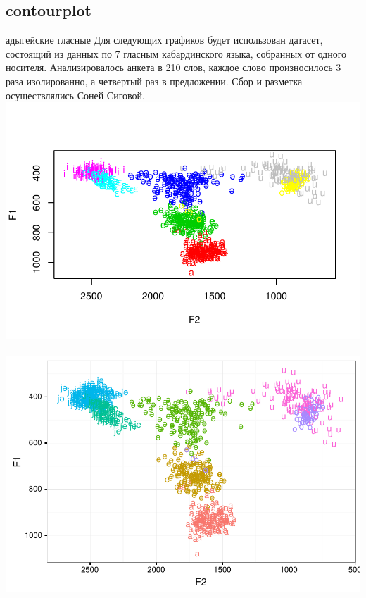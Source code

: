 \subsection{contourplot}
\begin{frame}{адыгейские гласные}
Для следующих графиков будет использован датасет, состоящий из данных по 7 гласным кабардинского языка, собранных от одного носителя. Анализировалось анкета в 210 слов, каждое слово произносилось 3 раза изолированно, а четвертый раз в предложении. Сбор и разметка осуществлялись Соней Сиговой.
\includegraphics[width=0.49\linewidth]{032-base-adyghe.pdf}~
\includegraphics[width=0.49\linewidth]{032-ggplot-adyghe.pdf}
\end{frame}
